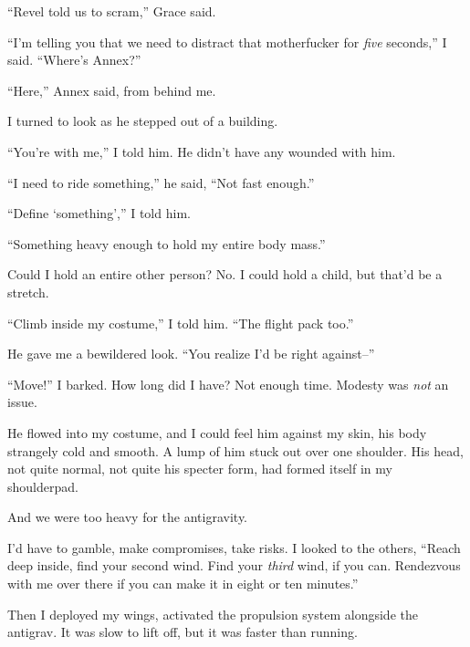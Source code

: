 ``Revel told us to scram,'' Grace said.



``I'm telling you that we need to distract that motherfucker for \emph{five} seconds,'' I said.  ``Where's Annex?''



``Here,'' Annex said, from behind me.



I turned to look as he stepped out of a building.



``You're with me,'' I told him.  He didn't have any wounded with him.



``I need to ride something,'' he said, ``Not fast enough.''



``Define `something','' I told him.



``Something heavy enough to hold my entire body mass.''



Could I hold an entire other person?  No.  I could hold a child, but that'd be a stretch.



``Climb inside my costume,'' I told him.  ``The flight pack too.''



He gave me a bewildered look.  ``You realize I'd be right against--''



``Move!''  I barked.  How long did I have?  Not enough time.  Modesty was \emph{not} an issue.



He flowed into my costume, and I could feel him against my skin, his body strangely cold and smooth.  A lump of him stuck out over one shoulder.  His head, not quite normal, not quite his specter form, had formed itself in my shoulderpad.



And we were too heavy for the antigravity.



I'd have to gamble, make compromises, take risks.  I looked to the others, ``Reach deep inside, find your second wind.  Find your \emph{third} wind, if you can.  Rendezvous with me over there if you can make it in eight or ten minutes.''



Then I deployed my wings, activated the propulsion system alongside the antigrav.  It was slow to lift off, but it was faster than running. 



